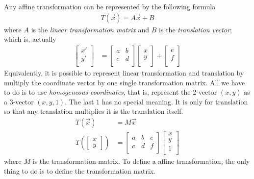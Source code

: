 \documentclass{note}
\begin{document}
Any affine transformation can be represented by the following formula
\begin{align*}
    T(\vec{x}) = A\vec{x} + B
\end{align*}
where $A$ is the \textit{linear transformation matrix} and $B$ is the \textit{translation vector}; which is, actually
\begin{align*}
    \begin{bmatrix} 
        x' \\ 
        y' \\
    \end{bmatrix} 
    & = 
    \begin{bmatrix}
        a & b \\
        c & d \\
    \end{bmatrix}
    \begin{bmatrix}
        x \\
        y \\
    \end{bmatrix}
    +
    \begin{bmatrix}
        e \\
        f \\
    \end{bmatrix}
\end{align*}
Equivalently, it is possible to represent linear transformation and translation by multiply the coordinate vector by one single transformation matrix. All we have to do is to use \textit{homogeneous coordinates}, that is, represent the 2-vector $(x, y)$ as a 3-vector $(x, y, 1)$. The last $1$ has no special meaning. It is only for translation so that any translation multiplies it is the translation itself.
\begin{align*}
    T(\vec{x}) & = M\vec{x} \\
    T\left(
    \begin{bmatrix}
        x \\
        y
    \end{bmatrix}
    \right)
    & = 
    \begin{bmatrix}
        a & b & e \\
        c & d & f \\
    \end{bmatrix}
    \begin{bmatrix}
        x \\
        y \\
        1 \\
    \end{bmatrix}
\end{align*}
where $M$ is the transformation matrix. To define a affine transformation, the only thing to do is to define the transformation matrix.
\end{document}

